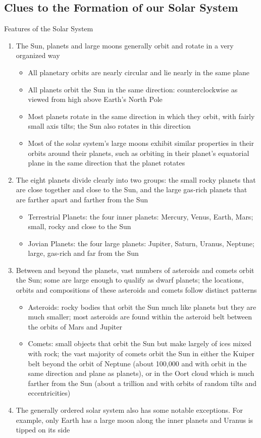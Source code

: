 \documentclass[12pt]{article}
\begin{document}
\subsection{Clues to the Formation of our Solar System} 
Features of the Solar System \begin{enumerate} 
\item The Sun, planets and large moons generally orbit and rotate in a very organized way \begin{itemize} 
\item All planetary orbits are nearly circular and lie nearly in the same plane 
\item All planets orbit the Sun in the same direction: counterclockwise as viewed from high above Earth's North Pole 
\item Most planets rotate in the same direction in which they orbit, with fairly small axis tilts; the Sun also rotates in this direction
\item Most of the solar system's large moons exhibit similar properties in their orbits around their planets, such as orbiting in their planet's equatorial plane in the same direction that the planet rotates \end{itemize}
\item The eight planets divide clearly into two groups: the small rocky planets that are close together and close to the Sun, and the large gas-rich planets that are farther apart and farther from the Sun \begin{itemize} 
\item Terrestrial Planets: the four inner planets: Mercury, Venus, Earth, Mars; small, rocky and close to the Sun
\item Jovian Planets: the four large planets: Jupiter, Saturn, Uranus, Neptune; large, gas-rich and far from the Sun \end{itemize} 
\item Between and beyond the planets, vast numbers of asteroids and comets orbit the Sun; some are large enough to qualify as dwarf planets; the locations, orbits and compositions of these asteroids and comets follow distinct patterns \begin{itemize} 
\item Asteroids: rocky bodies that orbit the Sun much like planets but they are much smaller; most asteroids are found within the asteroid belt between the orbits of Mars and Jupiter
\item Comets: small objects that orbit the Sun but make largely of ices mixed with rock; the vast majority of comets orbit the Sun in either the Kuiper belt beyond the orbit of Neptune (about 100,000 and with orbit in the same direction and plane as planets), or in the Oort cloud which is much farther from the Sun (about a trillion and with orbits of random tilts and eccentricities) \end{itemize}
\item The generally ordered solar system also has some notable exceptions. For example, only Earth has a large moon along the inner planets and Uranus is tipped on its side \end{enumerate} 
\end{document}
